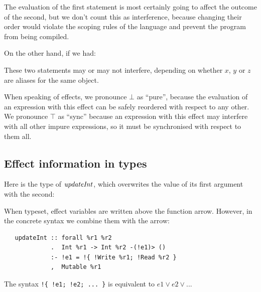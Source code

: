 
The evaluation of the first statement is most certainly going to affect the outcome of the second, but we don't count this as interference, because changing their order would violate the scoping rules of the language and prevent the program from being compiled.

On the other hand, if we had:


These two statements may or may not interfere, depending on whether $x$, $y$ or $z$ are aliases for the same object.

When speaking of effects, we pronounce $\bot$ as ``pure'', because the evaluation of an expression with this effect can be safely reordered with respect to any other. We pronounce $\top$ as ``sync'' because an expression with this effect may interfere with all other impure expressions, so it must be synchronised with respect to them all.

\subsection{Effect information in types}
\label{System:Effect:information-in-types}

Here is the type of $\operatorname{\mathit{updateInt}}$, which overwrites the value of its first argument with the second:


\clearpage{}
When typeset, effect variables are written above the function arrow. However, in the concrete syntax we combine them with the arrow:

\begin{small}
\begin{lstlisting}
   updateInt :: forall %r1 %r2
             .  Int %r1 -> Int %r2 -(!e1)> ()
             :- !e1 = !{ !Write %r1; !Read %r2 }
             ,  Mutable %r1 
\end{lstlisting}
\end{small}

The syntax \texttt{!\{ !e1; !e2; ... \}} is equivalent to \mbox{$e1 \lor e2 \lor ...$}

